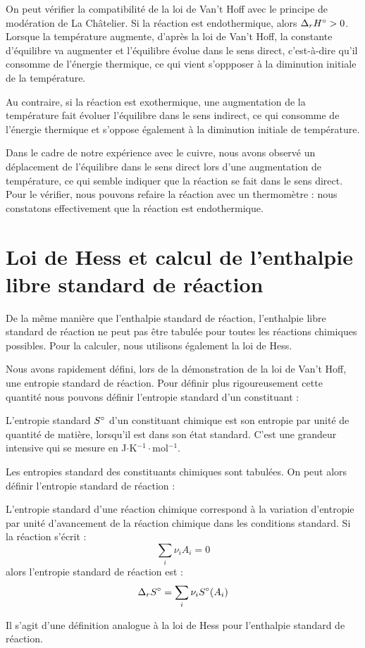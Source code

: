 \documentclass[11pt,fleqn]{book} %
\begin{document}
On peut vérifier la compatibilité de la loi de Van't Hoff avec le principe de modération de La Châtelier. Si la réaction est endothermique, alors $\Delta_r H\degree > 0$. Lorsque la température augmente, d'après la loi de Van't Hoff, la constante d'équilibre va augmenter et l'équilibre évolue dans le sens direct, c'est-à-dire qu'il consomme de l'énergie thermique, ce qui vient s'oppposer à la diminution initiale de la température.

Au contraire, si la réaction est exothermique, une augmentation de la température fait évoluer l'équilibre dans le sens indirect, ce qui consomme de l'énergie thermique et s'oppose également à la diminution initiale de température.

Dans le cadre de notre expérience avec le cuivre, nous avons observé un déplacement de l'équilibre dans le sens direct lors d'une augmentation de température, ce qui semble indiquer que la réaction se fait dans le sens direct. Pour le vérifier, nous pouvons refaire la réaction avec un thermomètre : nous constatons effectivement que la réaction est endothermique.

\section{Loi de Hess et calcul de l'enthalpie libre standard de réaction}

De la même manière que l'enthalpie standard de réaction, l'enthalpie libre standard de réaction ne peut pas être tabulée pour toutes les réactions chimiques possibles. Pour la calculer, nous utilisons également la loi de Hess.

Nous avons rapidement défini, lors de la démonstration de la loi de Van't Hoff, une entropie standard de réaction. Pour définir plus rigoureusement cette quantité nous pouvons définir l'entropie standard d'un constituant :
\begin{definition}
    L'entropie standard $S\degree$ d'un constituant chimique est son entropie par unité de quantité de matière, lorsqu'il est dans son état standard. C'est une grandeur intensive qui se mesure en J$\cdot$K$^{-1}\cdot$mol$^{-1}$. 
\end{definition}
Les entropies standard des constituants chimiques sont tabulées. On peut alors définir l'entropie standard de réaction :
\begin{definition}
    L'entropie standard d'une réaction chimique correspond à la variation d'entropie par unité d'avancement de la réaction chimique dans les conditions standard. Si la réaction s'écrit :
    \begin{equation}
        \sum_i \nu_i A_i = 0
    \end{equation}
    alors l'entropie standard de réaction est :
    \begin{equation}
        \Delta_r S\degree = \sum_i \nu_i S\degree(A_i)
    \end{equation}
\end{definition}
Il s'agit d'une définition analogue à la loi de Hess pour l'enthalpie standard de réaction. 
\end{document}
